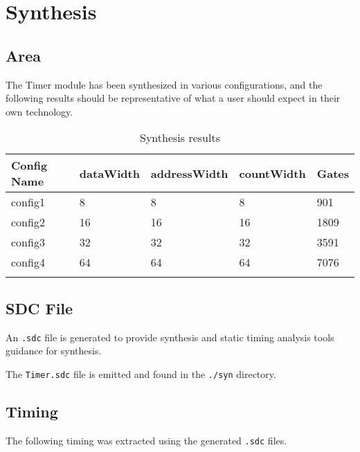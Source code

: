 \section{Synthesis}

\subsection{Area}
The Timer module has been synthesized in various configurations, and the following results should be representative of what a user should expect in their own technology.

\renewcommand*{\arraystretch}{1.4}
\begin{longtable}[H]{
    | p{}
    | p{}
    | p{}
    | p{}
    | p{} |
  }
  \hline
  \textbf{Config Name}   &
  \textbf{dataWidth}     &
  \textbf{addressWidth}  &
  \textbf{countWidth}    &
  \textbf{Gates}           \\ \hline \hline

  config1 &
  8 &
  8 &
  8 &
  901 \\ \hline

  config2 &
  16 &
  16 &
  16 &
  1809 \\ \hline

  config3 &
  32 &
  32 &
  32 &
  3591 \\ \hline

  config4 &
  64 &
  64 &
  64 &
  7076 \\ \hline

  \caption{Synthesis results}\label{table:area}
\end{longtable}

\subsection{SDC File}
An \texttt{.sdc} file is generated to provide synthesis and static timing analysis tools guidance for synthesis.

The \texttt{Timer.sdc} file is emitted and found in the \texttt{./syn} directory.

\subsection{Timing}
The following timing was extracted using the generated \texttt{.sdc} files.

